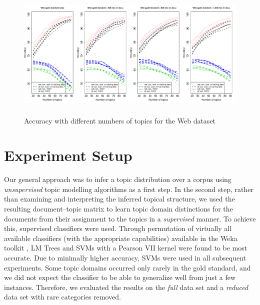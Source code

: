 \documentclass[11pt]{article}
\begin{document}
\begin{figure}[!ht]
  \centering
  \includegraphics[width=\textwidth, height=6.4cm]{graphics/cow.pdf}
  \caption{Accuracy with different numbers of topics for the Web dataset}
  \label{fig:cow}
\end{figure}

\section{Experiment Setup}
\label{sec:experiment}

Our general approach was to infer a topic distribution over a corpus using \textit{unsupervised} topic modelling algorithms as a first step.
In the second step, rather than examining and interpreting the inferred topical structure, we used the resulting document--topic matrix to learn topic domain distinctions for the documents from their assignment to the topics in a \textit{supervised} manner.
To achieve this, supervised classifiers were used.
Through permutation of virtually all available classifiers (with the appropriate capabilities) available in the Weka toolkit \cite{HallWitten2011}, LM Trees \cite{LandwehrEa2005} and SVMs with a Pearson VII kernel \cite{UstunEa2006} were found to be most accurate.
Due to minimally higher accuracy, SVMs were used in all subsequent experiments.
Some topic domains occurred only rarely in the gold standard, and we did not expect the classifier to be able to generalize well from just a few instances.
Therefore, we evaluated the results on the \textit{full} data set and a \textit{reduced} data set with rare categories removed.
\end{document}
